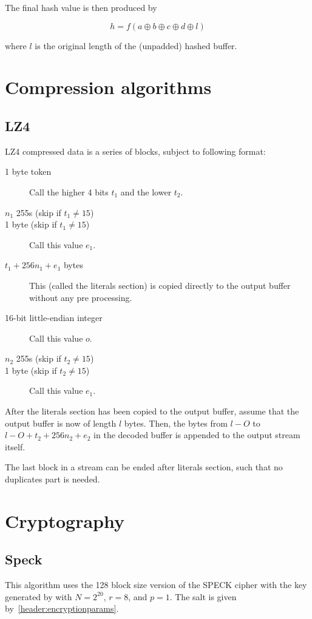 \documentclass[11pt,a4paper]{report}
\begin{document}
        The final hash value is then produced by

        $$h = f(a \oplus b \oplus c \oplus d \oplus l) $$

        where $l$ is the original length of the (unpadded) hashed buffer.

    \section{Compression algorithms}
        \subsection{LZ4}
        \label{compression:lz4}
        LZ4 compressed data is a series of blocks, subject to following format:

        \begin{description}
            \item [1 byte token] Call the higher 4 bits $t_1$ and the lower $t_2$.
            \item [$n_1$ 255s (skip if $t_1 \neq 15$)]
            \item [1 byte (skip if $t_1 \neq 15$)] Call this value $e_1$.
            \item [$t_1 + 256n_1 + e_1$ bytes] This (called the literals
                section) is copied directly to the output buffer without any
                pre processing.
            \item [16-bit little-endian integer] Call this value $o$.
            \item [$n_2$ 255s (skip if $t_2 \neq 15$)]
            \item [1 byte (skip if $t_2 \neq 15$)] Call this value $e_1$.
        \end{description}

        After the literals section has been copied to the output buffer, assume
        that the output buffer is now of length $l$ bytes. Then, the bytes from
        $l - O$ to $l - O + t_2 + 256n_2 + e_2$ in the decoded buffer is
        appended to the output stream itself.

        The last block in a stream can be ended after literals section, such
        that no duplicates part is needed.

    \section{Cryptography}
        \subsection{Speck}
        \label{crypto:speck}
        This algorithm uses the 128 block size version of the SPECK
        cipher\cite{speck} with the key generated by \cite{scrypt} with $N =
        2^{20}$, $r = 8$, and $p = 1$. The salt is given
        by~\ref{header:encryptionparams}.
\end{document}
